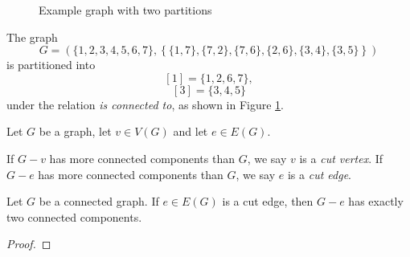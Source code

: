 \begin{figure}[ht!]
    \centering
\caption{Example graph with two partitions}
\label{fig:partition-graph-example}
\end{figure}

\begin{exmp}
    The graph
    \[G = (\{1, 2, 3, 4, 5, 6, 7\}, \left\{\{1, 7\}, \{7, 2\}, \{7, 6\}, \{2, 6\}, \{3, 4\}, \{3, 5\}\right\})\]
    is partitioned into
    \[[1] = \{1, 2, 6, 7\},\]
    \[[3] = \{3, 4, 5\}\] under the relation \emph{is connected to}, as shown in Figure \ref{fig:partition-graph-example}.
\end{exmp}

\begin{defn}
    Let $G$ be a graph, let $v \in V(G)$ and let $e \in E(G)$.

    If $G - v$ has more connected components than $G$, we say $v$ is a \emph{cut vertex}. If $G - e$ has more connected components than $G$, we say $e$ is a \emph{cut edge}.
\end{defn}

\begin{thm}\label{thm:cut-edge}
    Let $G$ be a connected graph. If $e \in E(G)$ is a cut edge, then $G - e$ has exactly two connected components.
\end{thm}

\begin{proof}
    
\end{proof}

